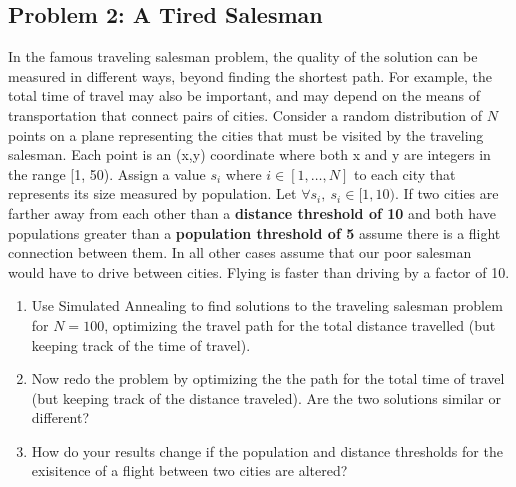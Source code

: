 \documentclass[11pt]{article}
\begin{document}
    \subsection{Problem 2: A Tired
Salesman}\label{problem-2-a-tired-salesman}

In the famous traveling salesman problem, the quality of the solution
can be measured in different ways, beyond finding the shortest path. For
example, the total time of travel may also be important, and may depend
on the means of transportation that connect pairs of cities. Consider a
random distribution of \(N\) points on a plane representing the cities
that must be visited by the traveling salesman. Each point is an (x,y)
coordinate where both x and y are integers in the range {[}1, 50).
Assign a value \(s_i\) where \(i\in [1,\dots,N]\) to each city that
represents its size measured by population. Let
\(\forall s_i, \  s_i \in [1, 10)\). If two cities are farther away from
each other than a \textbf{distance threshold of 10} and both have
populations greater than a \textbf{population threshold of 5} assume
there is a flight connection between them. In all other cases assume
that our poor salesman would have to drive between cities. Flying is
faster than driving by a factor of 10.

\begin{enumerate}
\def\labelenumi{\arabic{enumi}.}
\item
  Use Simulated Annealing to find solutions to the traveling salesman
  problem for \(N=100\), optimizing the travel path for the total
  distance travelled (but keeping track of the time of travel).
\item
  Now redo the problem by optimizing the the path for the total time of
  travel (but keeping track of the distance traveled). Are the two
  solutions similar or different?
\item
  How do your results change if the population and distance thresholds
  for the exisitence of a flight between two cities are altered?
\end{enumerate}
\end{document}
